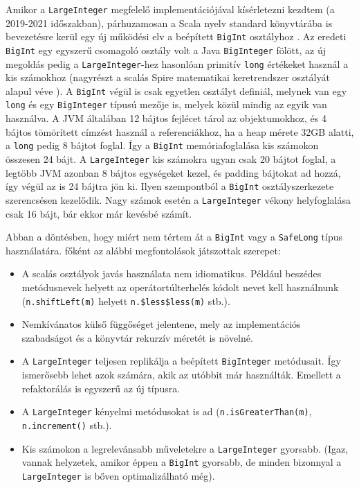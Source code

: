 \documentclass[
    parspace,
    noindent,
    nohyp,
]{elteiktdk}[2023/04/10]
\begin{document}
Amikor a \texttt{LargeInteger} megfelelő implementációjával kísérletezni kezdtem (a 2019-2021 időszakban),
párhuzamosan a Scala nyelv standard könyvtárába is bevezetésre kerül
egy új működési elv a beépített \texttt{BigInt} osztályhoz%
\cite{Rosset2019ScalaBigInt}.
Az eredeti \texttt{BigInt} egy egyszerű csomagoló osztály volt a Java \texttt{BigInteger} fölött,
az új megoldás pedig a \texttt{LargeInteger}-hez hasonlóan
primitív \texttt{long} értékeket használ a kis számokhoz
(nagyrészt a scalás Spire matematikai keretrendszer  osztályát alapul véve%
\cite{SoftwareScalaSpire}).
A \texttt{BigInt} végül is csak egyetlen osztályt definiál,
melynek van egy \texttt{long} és egy \texttt{BigInteger} típusú mezője is,
melyek közül mindig az egyik van használva.
A JVM általában 12 bájtos fejlécet tárol az objektumokhoz,
és 4 bájtos tömörített címzést használ a referenciákhoz, ha a heap mérete 32GB alatti,
a \texttt{long} pedig 8 bájtot foglal.
Így a \texttt{BigInt} memóriafoglalása kis számokon összesen 24 bájt.
A \texttt{LargeInteger} kis számokra ugyan csak 20 bájtot foglal,
a legtöbb JVM azonban 8 bájtos egységeket kezel, és padding bájtokat ad hozzá,
így végül az is 24 bájtra jön ki.
Ilyen szempontból a \texttt{BigInt} osztályszerkezete szerencsésen kezelődik.
Nagy számok esetén a \texttt{LargeInteger} vékony helyfoglalása csak 16 bájt,
bár ekkor már kevésbé számít.

Abban a döntésben, hogy miért nem tértem át a \texttt{BigInt} vagy a \texttt{SafeLong} típus használatára.
főként az alábbi megfontolások játszottak szerepet:

\begin{itemize}
    \item A scalás osztályok javás használata nem idiomatikus.
          Például beszédes metódusnevek helyett az operátortúlterhelés kódolt nevet kell használnunk
          (\texttt{n.shiftLeft(m)} helyett \texttt{n.\$less\$less(m)} stb.).
    \item Nemkívánatos külső függőséget jelentene,
          mely az implementációs szabadságot és a könyvtár rekurzív méretét is növelné.
    \item A \texttt{LargeInteger} teljesen replikálja a beépített \texttt{BigInteger} metódusait.
          Így ismerősebb lehet azok számára, akik az utóbbit már használták.
          Emellett a refaktorálás is egyszerű az új típusra.
    \item A \texttt{LargeInteger} kényelmi metódusokat is ad
          (\texttt{n.isGreaterThan(m)}, \texttt{n.increment()} stb.).
    \item Kis számokon a legrelevánsabb műveletekre a \texttt{LargeInteger} gyorsabb.
          (Igaz, vannak helyzetek, amikor éppen a \texttt{BigInt} gyorsabb,
          de minden bizonnyal a \texttt{LargeInteger} is bőven optimalizálható még).
\end{itemize}
\end{document}
